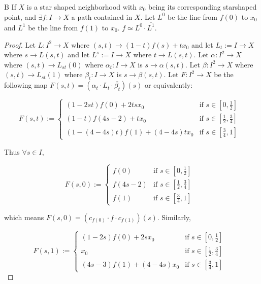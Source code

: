 \documentclass{article}
\begin{document}
\bigskip

\begin{LEM}{B}
    If $X$ is a star shaped neighborhood with $x_0$ being its corresponding starshaped point, and $\exists f: I \to X$ a path contained in $X$. Let $L^0$ be the line from $f(0)$ to $x_0$ and $L^1$ be the line from $f(1)$ to $x_0$. $f \simeq L^0 \cdot \overline{L^1}$.  
\end{LEM}
\begin{proof}
    Let $L: I^2 \to X$ where $(s, t) \to (1 - t)f(s) + t x_0$ and let $L_t := I \to X$ where $s \to L(s, t)$ and let $L^s := I \to X$ where $t \to L(s, t)$. Let $\alpha: I^2 \to X$ where $(s, t) \to L_{st}(0)$ where $\alpha_t : I \to X$ is $s \to \alpha(s, t)$. Let $\beta: I^2 \to X$ where $(s, t) \to L_{st}(1)$ where $\beta_t : I \to X$ is $s \to \beta(s, t)$. Let $F: I^2 \to X$ be the following map $F(s, t) = (\alpha_t \cdot L_t \cdot \overline{\beta_t})(s)$ or equivalently: 
    
    \begin{equation*}
        F(s, t) := \begin{cases*}
            (1 - 2st) f(0) + 2tsx_0 & \text{if $s \in [0, \frac{1}{2}]$ } \\
            (1 - t)f(4s - 2) + t x_0 & \text{if $s \in [\frac{1}{2}, \frac{3}{4}]$ } \\
            (1 - (4 - 4s)t)f(1) + (4 - 4s)tx_0 & \text{if $s \in [\frac{3}{4}, 1]$ }
        \end{cases*}
    \end{equation*}

    Thus $\forall s \in I$, 
    
    \begin{equation*}
        F(s, 0) := \begin{cases*}
            f(0) & \text{if $s \in [0, \frac{1}{2}]$ } \\
            f(4s - 2) & \text{if $s \in [\frac{1}{2}, \frac{3}{4}]$ } \\
            f(1) & \text{if $s \in [\frac{3}{4}, 1]$ }
        \end{cases*}
    \end{equation*}

    which means $F(s, 0) = (c_{f(0)} \cdot f \cdot c_{f(1)})(s)$. Similarly, 
    
    \begin{equation*}
        F(s, 1) := \begin{cases*}
            (1 - 2s) f(0) + 2sx_0 & \text{if $s \in [0, \frac{1}{2}]$ } \\
            x_0 & \text{if $s \in [\frac{1}{2}, \frac{3}{4}]$ } \\
            (4s - 3)f(1) + (4 - 4s)x_0 & \text{if $s \in [\frac{3}{4}, 1]$ }
        \end{cases*}
    \end{equation*} 


\end{proof}
\end{document}
